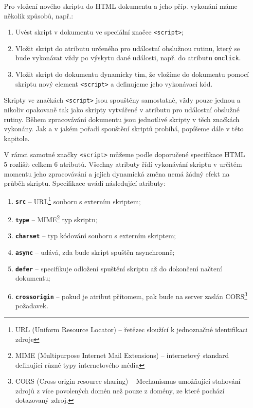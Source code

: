 \noindent Pro vložení nového skriptu do HTML dokumentu a jeho příp. vykonání máme několik způsobů, např.:

\begin{enumerate}
  \item Uvést skript v dokumentu ve speciální značce \texttt{<script>};
  \item Vložit skript do atributu určeného pro událostní obslužnou rutinu, který se bude vykonávat vždy po výskytu dané události, např. do atributu \texttt{onclick}.
  \item Vložit skript do dokumentu dynamicky tím, že vložíme do dokumentu pomocí skriptu nový element \texttt{<script>} a definujeme jeho vykonávací kód.
\end{enumerate}

Skripty ve značkách \texttt{<script>} jsou spouštěny samostatně, vždy pouze jednou a nikoliv opakovaně tak jako skripty vytvářené v atributu pro událostní obslužné rutiny. Během zpracovávání dokumentu jsou jednotlivé skripty v těch značkách vykonány. Jak a v jakém pořadí spouštění skriptů probíhá, popíšeme dále v této kapitole.

V rámci samotné značky \texttt{<script>} můžeme podle doporučené specifikace HTML 5 rozlišit celkem 6 atributů. Všechny atributy řídí vykonávání skriptu v určitém momentu jeho zpracovávání a jejich dynamická změna nemá žádný efekt na průběh skriptu. Specifikace uvádí následující atributy:

\begin{enumerate}
  \item \textbf{\texttt{src}} -- URL\footnote{URL (Uniform Resource Locator) -- řetězec sloužící k jednoznačné identifikaci zdroje} souboru s externím skriptem;
  \item \textbf{\texttt{type}} -- MIME\footnote{MIME (Multipurpose Internet Mail Extensions) -- internetový standard definující různé typy internetového média} typ skriptu;
  \item \textbf{\texttt{charset}} -- typ kódování souboru s externím skriptem;
  \item \textbf{\texttt{async}} -- udává, zda bude skript spuštěn asynchronně;
  \item \textbf{\texttt{defer}} -- specifikuje odložení spuštění skriptu až do dokončení načtení dokumentu;
  \item \textbf{\texttt{crossorigin}} -- pokud je atribut přítomem, pak bude na server zaslán CORS\footnote{ CORS (Cross-origin resource sharing) -- Mechanismus umožňující stahování zdrojů z více povolených domén než pouze z domény, ze které pochází dotazovaný zdroj.} požadavek. 
\end{enumerate}

